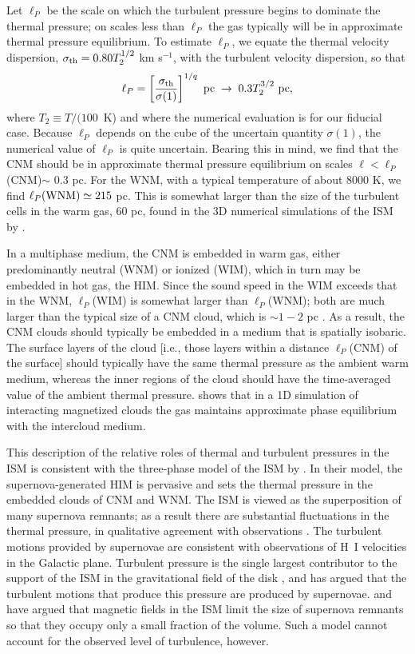 \documentclass[12pt,preprint,flushrt]{aastex}
\newcommand{\beq}{\begin{equation}}
\newcommand{\eeq}{\end{equation}}
\newcommand{\e}{$^{-1}$}
\newcommand{\ellp}{\ell_{P}}
\newcommand{\sth}{\sigma_{\rm th}}
\begin{document}
    Let $\ellp$ be the scale on which the turbulent
pressure begins to dominate the thermal pressure;
on scales less than $\ellp$ the gas typically will be
in approximate thermal pressure equilibrium.
To estimate $\ellp$,
we equate the thermal velocity dispersion, $\sth=0.80 T_2^{1/2}$ km s\e,
with the turbulent velocity dispersion, so that
\beq
\ellp=\left[\frac{\sth}{\sigma(1)}\right]^{1/q}~{\rm pc}\;
        \rightarrow\; 0.3T_2^{3/2}~{\rm pc},
\eeq
where $T_2\equiv T/(100$~K) and
where the numerical evaluation is for our fiducial case.
Because $\ellp$ depends on the cube of the uncertain
quantity $\sigma(1)$, the numerical value of $\ellp$ is
quite uncertain.  Bearing this in mind, we find that
the CNM should be in approximate thermal pressure equilibrium on
scales $\ell<\ellp$(CNM)$\sim$ 0.3 pc.
For the WNM, with a typical temperature of
about 8000 K, we find $\ellp(\rm WNM)\simeq 215$ pc.
This is somewhat larger than the size of the turbulent cells in the warm
gas, 60 pc, found in the 3D
numerical simulations of the ISM by \cite{kor99}.

In a multiphase medium, the CNM is embedded
in warm gas, either predominantly neutral (WNM) or ionized (WIM),
which in turn may be embedded in hot gas,
the HIM.  Since the sound speed in the WIM exceeds that
in the WNM, $\ellp$(WIM) is somewhat larger than
$\ellp$(WNM); both are much larger than
the typical size of a CNM cloud, which is
$\sim 1-2$ pc
\citep{mck77}.  As a result, the CNM clouds should typically
be embedded in a medium that is spatially isobaric.
The surface layers of the cloud [i.e., those
layers within a distance $\ellp$(CNM) of
the surface] should typically have the same thermal pressure
as the ambient warm medium, whereas the inner regions
of the cloud should have the time-averaged value
of the ambient thermal pressure. \cite{elm97}
shows that in a 1D simulation of interacting magnetized clouds the
gas maintains approximate phase equilibrium with the intercloud
medium.

This description of the relative roles of thermal and turbulent pressures
in the ISM is consistent with the three-phase model of the ISM by
\cite{mck77}. In their model, the supernova-generated HIM is pervasive
and sets the thermal pressure in the embedded clouds of CNM and WNM.
The ISM is viewed as the superposition of many supernova remnants; as
a result there are substantial fluctuations in the thermal pressure, in
qualitative agreement with observations \citep{jen83,jen01}. The turbulent
motions provided by supernovae are consistent with observations of
H~I velocities in the Galactic plane. Turbulent pressure is the single
largest contributor to the support of the ISM in the gravitational field
of the disk \citep{bou90}, and \cite{mck90} has argued that the turbulent
motions that produce this pressure are produced by supernovae. \cite{slav93}
and \cite{cox95} have argued that magnetic fields in the ISM limit the
size of supernova remnants so that they occupy only a small fraction of
the volume. Such a model cannot account for the observed level of
turbulence, however.
\end{document}
